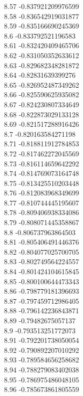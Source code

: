 {8.57	-0.837921209976599\\
8.58	-0.836542919031877\\
8.59	-0.835166690245369\\
8.6	-0.833792521196583\\
8.61	-0.832420409465706\\
8.62	-0.831050352633612\\
8.63	-0.829682348281872\\
8.64	-0.82831639399276\\
8.65	-0.826952487349262\\
8.66	-0.825590625935082\\
8.67	-0.824230807334649\\
8.68	-0.822873029133128\\
8.69	-0.821517288916426\\
8.7	-0.820163584271198\\
8.71	-0.818811912784853\\
8.72	-0.817462272045569\\
8.73	-0.816114659642292\\
8.74	-0.814769073164748\\
8.75	-0.813425510203448\\
8.76	-0.812083968349699\\
8.77	-0.810744445195607\\
8.78	-0.809406938334086\\
8.79	-0.808071445358867\\
8.8	-0.806737963864503\\
8.81	-0.805406491446376\\
8.82	-0.804077025700705\\
8.83	-0.802749564224557\\
8.84	-0.801424104615845\\
8.85	-0.800100644473343\\
8.86	-0.798779181396693\\
8.87	-0.797459712986405\\
8.88	-0.796142236843871\\
8.89	-0.79482675057137\\
8.9	-0.793513251772073\\
8.91	-0.792201738050054\\
8.92	-0.790892207010292\\
8.93	-0.789584656258682\\
8.94	-0.788279083402038\\
8.95	-0.786975486048105\\
8.96	-0.785673861805559\\
}
